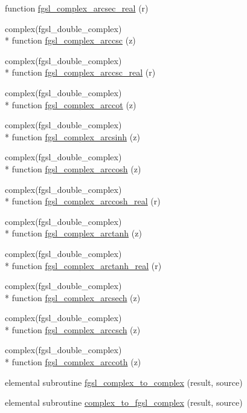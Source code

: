 \begin{DoxyCompactItemize}
function \hyperlink{complex_8finc_ad420c933fcc07872208823e44c965190}{fgsl\-\_\-complex\-\_\-arcsec\-\_\-real} (r)
\item 
complex(fgsl\-\_\-double\-\_\-complex) \\*
function \hyperlink{complex_8finc_ac438eff3b3caed126ae6c7929592f750}{fgsl\-\_\-complex\-\_\-arccsc} (z)
\item 
complex(fgsl\-\_\-double\-\_\-complex) \\*
function \hyperlink{complex_8finc_ac5b418b5127b93cddea551723a955143}{fgsl\-\_\-complex\-\_\-arccsc\-\_\-real} (r)
\item 
complex(fgsl\-\_\-double\-\_\-complex) \\*
function \hyperlink{complex_8finc_a4349b9f5549b6c97a88f6d35001bac3f}{fgsl\-\_\-complex\-\_\-arccot} (z)
\item 
complex(fgsl\-\_\-double\-\_\-complex) \\*
function \hyperlink{complex_8finc_ab4a2a9438ed50ba0bfc611356fb209f9}{fgsl\-\_\-complex\-\_\-arcsinh} (z)
\item 
complex(fgsl\-\_\-double\-\_\-complex) \\*
function \hyperlink{complex_8finc_a4b6f8f498bd3315137bdd2fa3c1ca32a}{fgsl\-\_\-complex\-\_\-arccosh} (z)
\item 
complex(fgsl\-\_\-double\-\_\-complex) \\*
function \hyperlink{complex_8finc_ae32a1fa2c5421b1c5a1a24ef6aa3f033}{fgsl\-\_\-complex\-\_\-arccosh\-\_\-real} (r)
\item 
complex(fgsl\-\_\-double\-\_\-complex) \\*
function \hyperlink{complex_8finc_aedade37b8cb8ecb0263b539e086a7538}{fgsl\-\_\-complex\-\_\-arctanh} (z)
\item 
complex(fgsl\-\_\-double\-\_\-complex) \\*
function \hyperlink{complex_8finc_a833a0d9d5e06c7ce4e1a041a537b0607}{fgsl\-\_\-complex\-\_\-arctanh\-\_\-real} (r)
\item 
complex(fgsl\-\_\-double\-\_\-complex) \\*
function \hyperlink{complex_8finc_a2749a6da119458521c78fe5899617a51}{fgsl\-\_\-complex\-\_\-arcsech} (z)
\item 
complex(fgsl\-\_\-double\-\_\-complex) \\*
function \hyperlink{complex_8finc_a6c54ce2eb2c92bf23c14ca4bdf149b73}{fgsl\-\_\-complex\-\_\-arccsch} (z)
\item 
complex(fgsl\-\_\-double\-\_\-complex) \\*
function \hyperlink{complex_8finc_a424df2d30a3b02a8b853c8687957c554}{fgsl\-\_\-complex\-\_\-arccoth} (z)
\item 
elemental subroutine \hyperlink{complex_8finc_aa6202d24e55756a77e0f5883f3ea0c84}{fgsl\-\_\-complex\-\_\-to\-\_\-complex} (result, source)
\item 
elemental subroutine \hyperlink{complex_8finc_a2cbad87c3e0a645db0b486c0f1fddf5a}{complex\-\_\-to\-\_\-fgsl\-\_\-complex} (result, source)
\end{DoxyCompactItemize}


